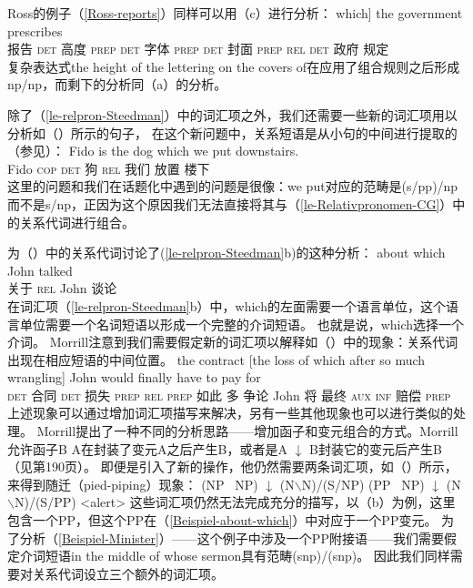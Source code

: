 Ross的例子（\ref{Ross-reports}）同样可以用（c）进行分析：
\ea
\gll [reports    [the height of the lettering on the covers of] which] the government prescribes\\
     \spacebr{}报告 \spacebr\textsc{det} 高度 \textsc{prep} \textsc{det} 字体 \textsc{prep} \textsc{det} 封面 \textsc{prep} \textsc{rel} \textsc{det} 政府 规定\\
\z
复杂表达式the height of the lettering on the covers of在应用了组合规则之后形成np/np，而剩下的分析同（a）的分析。

除了（\ref{le-relpron-Steedman}）中的词汇项之外，我们还需要一些新的词汇项用以分析如（）所示的句子，
在这个新问题中，关系短语是从小句的中间进行提取的（参见\citealp[]{Pollard88a}）：
\ea
\gll Fido is the dog which we put downstairs. \\
     Fido \textsc{cop} \textsc{det} 狗 \textsc{rel} 我们 放置 楼下 \\
\z
这里的问题和我们在话题化中遇到的问题是很像：we put对应的范畴是(s/pp)/np而不是s/np，正因为这个原因我们无法直接将其与（\ref{le-Relativpronomen-CG}）中的关系代词进行组合。

 \citet[]{Morrill95a}为（）中的关系代词讨论了(\ref{le-relpron-Steedman}b)的这种分析：
\ea
\label{Beispiel-about-which}
\gll about which John talked \\
     关于 \textsc{rel} John 谈论 \\
\z
在词汇项（\ref{le-relpron-Steedman}b）中，which的左面需要一个语言单位，这个语言单位需要一个名词短语以形成一个完整的介词短语。
也就是说，which选择一个介词。
Morrill注意到我们需要假定新的词汇项以解释如（）中的现象：关系代词出现在相应短语的中间位置。
\ea
\gll the          contract [the                 loss of           which after so much wrangling] John would finally have to pay for \\
     \textsc{det} 合同      \spacebr\textsc{det} 损失 \textsc{prep} \textsc{rel} \textsc{prep} 如此 多 争论 John 将 最终 \textsc{aux} \textsc{inf} 赔偿 \textsc{prep}\\
\z
上述现象可以通过增加词汇项描写来解决，另有一些其他现象也可以进行类似的处理。
Morrill提出了一种不同的分析思路——增加函子和变元组合的方式。Morrill允许函子B \up
\isc{$\uparrow$}\is{$\uparrow$} A在封装了变元A之后产生B，或者是A $\downarrow$
\isc{$\downarrow$}\is{$\downarrow$} B封装它的变元后产生B（见第190页）。
即便是引入了新的操作，他仍然需要两条词汇项，如（）所示，来得到随迁（pied-piping）现象：
\eal
\ex (NP \up\ NP) $\downarrow$ (N$\backslash$N)/(S/NP)
\ex (PP \up\ NP) $\downarrow$ (N$\backslash$N)/(S/PP)
\zl
<alert>
这些词汇项仍然无法完成充分的描写，以（b）为例，这里包含一个PP，但这个PP在（\ref{Beispiel-about-which}）中对应于一个PP变元。 
为了分析（\ref{Beispiel-Minister}）——这个例子中涉及一个PP附接语——我们需要假定介词短语in the middle of whose sermon具有范畴(s\bs np)/(s\bs np)。
因此我们同样需要对关系代词设立三个额外的词汇项。

